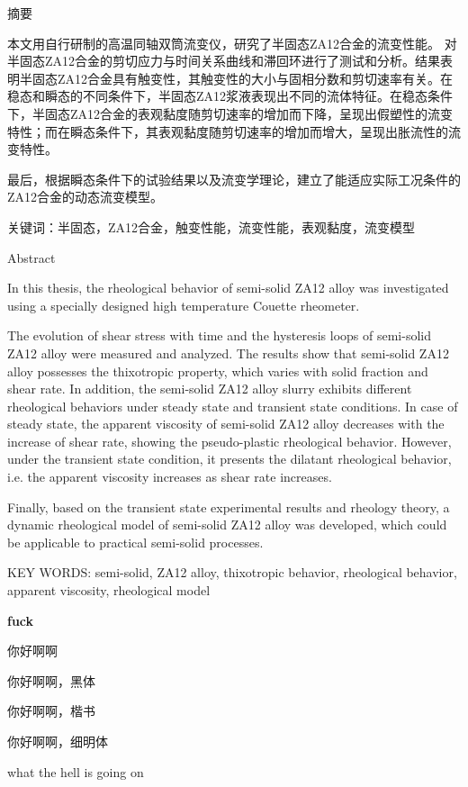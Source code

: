 \documentclass[a4paper, 12pt]{article}
\begin{document}
\begin{center}
\LARGE 摘\quad 要
\end{center}

{
\par 本文用自行研制的高温同轴双筒流变仪，研究了半固态ZA12合金的流变性能。
对半固态ZA12合金的剪切应力与时间关系曲线和滞回环进行了测试和分析。结果表明半固态ZA12合金具有触变性，其触变性的大小与固相分数和剪切速率有关。在稳态和瞬态的不同条件下，半固态ZA12浆液表现出不同的流体特征。在稳态条件下，半固态ZA12合金的表观黏度随剪切速率的增加而下降，呈现出假塑性的流变特性；而在瞬态条件下，其表观黏度随剪切速率的增加而增大，呈现出胀流性的流变特性。
\par 最后，根据瞬态条件下的试验结果以及流变学理论，建立了能适应实际工况条件的ZA12合金的动态流变模型。\newline

\noindent 关键词：半固态，ZA12合金，触变性能，流变性能，表观黏度，流变模型
}
\newpage

\begin{center}
Abstract
\end{center}
\par In this thesis, the rheological behavior of semi-solid ZA12 alloy was investigated using a specially designed high temperature Couette rheometer.
\par The evolution of shear stress with time and the hysteresis loops of semi-solid ZA12 alloy were measured and analyzed. The results show that semi-solid ZA12 alloy possesses the thixotropic property, which varies with solid fraction and shear rate. In addition, the semi-solid ZA12 alloy slurry exhibits different rheological behaviors under steady state and transient state conditions. In case of steady state, the apparent viscosity of semi-solid ZA12 alloy decreases with the increase of shear rate, showing the pseudo-plastic rheological behavior. However, under the transient state condition, it presents the dilatant rheological behavior, i.e. the apparent viscosity increases as shear rate increases.
\par Finally, based on the transient state experimental results and rheology theory, a dynamic rheological model of semi-solid ZA12 alloy was developed, which could be applicable to practical semi-solid processes.\newline

\noindent KEY WORDS: semi-solid, ZA12 alloy, thixotropic behavior, rheological behavior, apparent viscosity, rheological model
\newpage

\tableofcontents


\vspace{5cm}

\textbf{fuck}

\bigskip
你好啊啊

{\heiti 你好啊啊，黑体}

{\kaishu 你好啊啊，楷书}

{\mlu 你好啊啊，细明体}

what the hell is going on 
\end{document}
